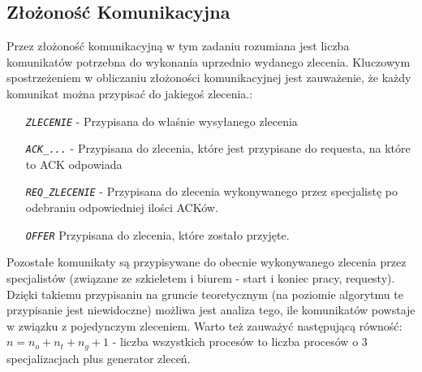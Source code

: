 \documentclass[12pt]{article}
\newcommand{\msg}[1]{\texttt{\emph{#1}}}
\begin{document}
\subsection{Złożoność Komunikacyjna}
Przez złożoność komunikacyjną w tym zadaniu rozumiana jest liczba komunikatów potrzebna do wykonania uprzednio wydanego zlecenia. Kluczowym spostrzeżeniem w obliczaniu złożoności komunikacyjnej jest zauważenie, że każdy komunikat można przypisać do jakiegoś zlecenia.:
\begin{enumerate}
	\item[\msg{ZLECENIE}] - Przypisana do właśnie wysyłanego zlecenia
	\item[\msg{ACK\_...}] - Przypisana do zlecenia, które jest przypisane do requesta, na które to ACK odpowiada
	\item[\msg{REQ\_ZLECENIE}] - Przypisana do zlecenia wykonywanego przez specjalistę po odebraniu odpowiedniej ilości ACKów.
	\item[\msg{OFFER}] Przypisana do zlecenia, które zostało przyjęte.
\end{enumerate}
Pozostałe komunikaty są przypisywane do obecnie wykonywanego zlecenia przez specjalistów (związane ze szkieletem i biurem - start i koniec pracy, requesty). Dzięki takiemu przypisaniu na gruncie teoretycznym (na poziomie algorytmu te przypisanie jest niewidoczne) możliwa jest analiza tego, ile komunikatów powstaje w związku z pojedynczym zleceniem. Warto też zauważyć następującą równość: \(n=n_o+n_t+n_g+1\) - liczba wszystkich procesów to liczba procesów o 3 specjalizacjach plus generator zleceń.
\end{document}
